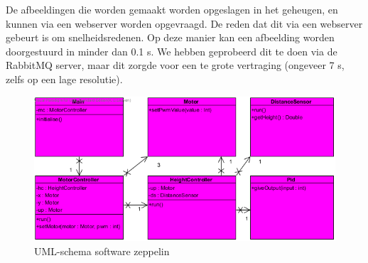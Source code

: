 \documentclass[eind]{penoverslag}
\begin{document}
De afbeeldingen die worden gemaakt worden opgeslagen in het geheugen, en kunnen via een webserver worden opgevraagd. De reden dat dit via een webserver gebeurt is om snelheidsredenen. Op deze manier kan een afbeelding worden doorgestuurd in minder dan 0.1 s. We hebben geprobeerd dit te doen via de RabbitMQ server, maar dit zorgde voor een te grote vertraging (ongeveer 7 s, zelfs op een lage resolutie). \\

\begin{figure}[H]
\begin{center}
\includegraphics[width=\textwidth]{classdiagrampeno2.png}
\end{center}
\caption{UML-schema software zeppelin}
\label{softwareZeppelin}
\end{figure}
\end{document}
